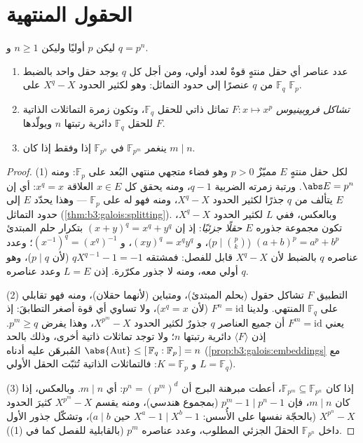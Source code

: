 \section{الحقول المنتهية}

\begin{theorem}\label{thm:b3:galois:finitefields}
ليكن $p$ أوليًا وليكن $n \geq 1$ و $q = p^n$.
\begin{enumerate}
  \item عدد عناصر أي حقل منتهٍ قوةٌ لعدد أولي، ومن أجل كل $q$
        يوجد حقل واحد بالضبط $\mathbb F_q$ من $q$ عنصرًا إلى
        حدود التماثل: وهو  لكثير الحدود $X^q - X$
        على $\mathbb F_p$.
  \item \emph{تشاكل فروبينيوس}
        $F
        \colon x \mapsto x^p$ تماثل ذاتي للحقل $\mathbb
        F_q$، وتكون زمرة التماثلات
        الذاتية للحقل $\mathbb F_q$ دائرية رتبتها $n$ ويولّدها $F$.
  \item ينغمر $\mathbb F_{p^m}$ في $\mathbb F_{p^n}$ إذا وفقط إذا كان $m \mid
        n$.
\end{enumerate}
\end{theorem}

\begin{proof}
(1) لكل حقل منتهٍ $E$ مميّزٌ $p > 0$ وهو فضاء متجهي منتهي البُعد
على $\mathbb F_p$: ومنه $\abs E = p^n$. ورتبة زمرته الضربية
$q - 1$، ومنه يحقق كل $x \in E$ العلاقة $x^q = x$: أي إن $E$
يتألف من $q$ جذرًا لكثير الحدود $X^q - X$، ومنه فهو 
له على $\mathbb F_p$ --- وهذا يحدّد $E$ إلى حدود التماثل
(\cref{thm:b3:galois:splitting}). وبالعكس، ففي  $L$ لكثير الحدود
$X^q - X$، تكون مجموعة جذوره $E$ \emph{حقلًا جزئيًا}: إذ إن
$(x + y)^q = x^q + y^q$ بتكرار حلم المبتدئ $(a+b)^p = a^p + b^p$ ($p \mid \binom pk$)، و $(xy)^q = x^qy^q$، و $(x^{-1})^q = (x^q)^{-1}$؛
وعدد عناصره $q$ بالضبط لأن $X^q - X$ قابل للفصل: فمشتقه $qX^{q-1} - 1 = -1$
(لأن $p \mid q$)، وهو أولي معه، ومنه لا جذور مكرّرة. إذن
$L = E$ وعدد عناصره $q$.

(2) التطبيق $F$ تشاكل حقول (بحلم المبتدئ)، ومتباين (لأنهما
حقلان)، ومنه فهو تقابلي على $\mathbb F_q$ المنتهي. ولدينا
$F^n =
\mathrm{id}$ (لأن $x^q = x$)، ولا تساوي أي قوة أصغر التطابقَ: إذ
يعني $F^m = \mathrm{id}$ أن جميع العناصر $q$ جذورٌ لكثير الحدود
$X^{p^m} - X$، وهذا يفرض $p^m \geq q$. إذن $\langle F\rangle$ دائرية رتبتها
$n$؛ ولا توجد تماثلات ذاتية أخرى، وذلك بالحد $\abs{\operatorname{Aut}} \leq [\,\mathbb F_q :
\mathbb F_p\,] = n$ المُبرهَن
عليه أدناه (\cref{prop:b3:galois:embeddings} مع $L = \mathbb F_q$ و $K =
\mathbb F_p$: فالتماثلات
الذاتية تُثبّت الحقل الأولي).

(3) إذا كان $\mathbb F_{p^m} \subseteq \mathbb F_{p^n}$، أعطت مبرهنة البرج أن $p^n = (p^m)^d$: أي
$m \mid n$. وبالعكس، إذا كان $m \mid n$، فإن $p^m - 1 \mid p^n - 1$ (بمجموع
هندسي)، ومنه يقسم $X^{p^m} - X$ كثيرَ الحدود $X^{p^n} - X$
(بالحجّة نفسها على الأُسس: $X^{a} - 1 \mid X^{b}
- 1$ حين $a \mid b$)، وتشكّل جذور
الأول داخل $\mathbb F_{p^n}$ الحقلَ الجزئي المطلوب، وعدد عناصره $p^m$
(بالقابلية للفصل كما في (1)).
\end{proof}

